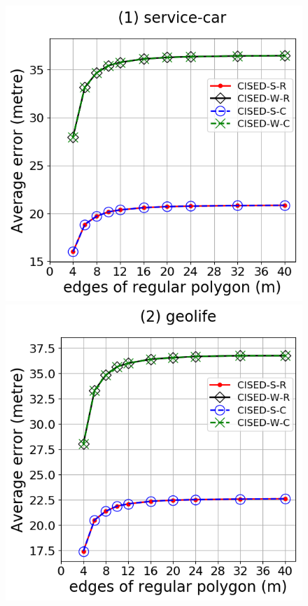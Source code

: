 \begin{figure}[tb!]
	\centering
	\includegraphics[scale = 0.2750]{Figures/Exp-M-e-60-error-service.png}\hspace{3ex}
	\includegraphics[scale = 0.2750]{Figures/Exp-M-e-60-error-geolife.png}\hspace{3ex}

\end{figure}

